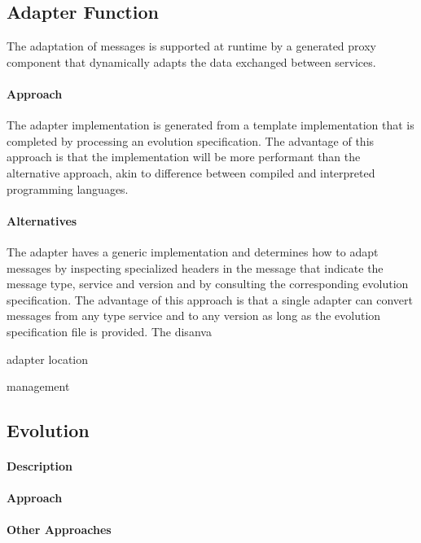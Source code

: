\subsection{Adapter Function} %
\label{sec:adapter_function}

The adaptation of messages is supported at runtime by a generated proxy component
that dynamically adapts the data exchanged between services.

\paragraph{Approach}
The adapter implementation is generated from a template implementation that is completed by processing an evolution specification.
The advantage of this approach is that the implementation will be more performant than the alternative approach,
akin to difference between compiled and interpreted programming languages.

\paragraph{Alternatives}
The adapter haves a generic implementation and determines how to adapt messages by inspecting specialized headers in the
message that indicate the message type, service and version and by consulting the corresponding evolution specification.
The advantage of this approach is that a single adapter can convert messages from any type service and to any version as long as the evolution specification file is provided.
The disanva

adapter location

management


\subsection{Evolution} %
\label{sec:evolution}

\paragraph{Description}
\paragraph{Approach}
\paragraph{Other Approaches}

